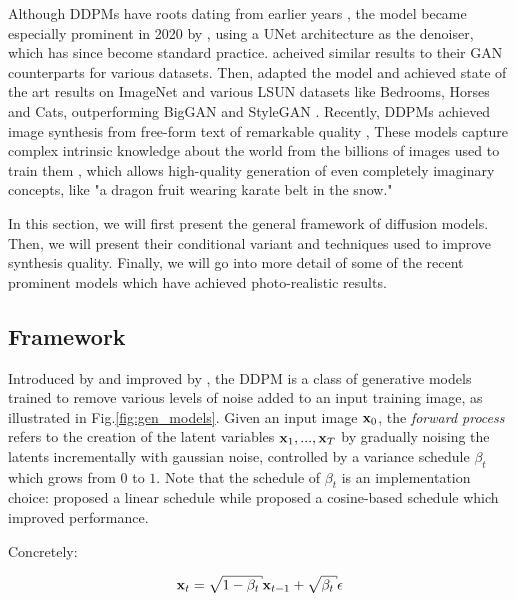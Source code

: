 Although \ac{DDPM}s have roots dating from earlier years \citep{sohl2015deep}, the model became 
especially prominent in 2020 by \cite{ho2020denoising}, using a UNet architecture 
as the denoiser, which has since become standard practice. \cite{ho2020denoising} acheived 
similar results to their 
\ac{GAN} counterparts for various datasets. Then, \cite{dhariwal2021diffusion} adapted 
the model and achieved state of the art results on ImageNet and various LSUN datasets like 
Bedrooms, Horses and Cats, outperforming BigGAN \citep{brock2018large} and StyleGAN \citep{karra2020stylegan2}. 
Recently, \ac{DDPM}s achieved image synthesis from free-form text of remarkable quality \citep{ramesh2022hierarchical, nichol2021glide, saharia2022photorealistic, gafni2022make, rombach2022high}, 
These models capture complex intrinsic knowledge about the world from the billions of images used to train them \citep{schuhmann2022laion}, which 
allows high-quality generation of even completely imaginary concepts, like "a dragon fruit wearing karate belt in the snow."

In this section, we will first present the general framework of diffusion models. Then, we will 
present their conditional variant and techniques used to improve synthesis quality. Finally, 
we will go into more detail of some of the recent prominent models which have achieved photo-realistic 
results.

\subsection{Framework}

Introduced by \cite{sohl2015deep} and improved by \cite{ho2020denoising}, the \ac{DDPM} is a class 
of generative models trained to remove various levels of noise added to an input training image, as illustrated in Fig.\ref{fig:gen_models}.
Given an input image $\mathbf{x}_0$, the \emph{forward process} refers to the creation of the latent variables 
$\mathbf{x}_1, ..., \mathbf{x}_T$ by gradually noising the latents incrementally with gaussian noise, controlled by 
a variance schedule ${\beta_t}$ which grows from $0$ to $1$. Note that the schedule of 
$\beta_t$ is an implementation choice: \cite{ho2020denoising} proposed a linear schedule while 
\cite{dhariwal2021diffusion} proposed a cosine-based schedule which improved performance.

Concretely:

\begin{equation}
      \x_t = \sqrt{1 - \beta_t} \x_{t-1} +  \sqrt{\beta_t} \epsilon
\end{equation}

